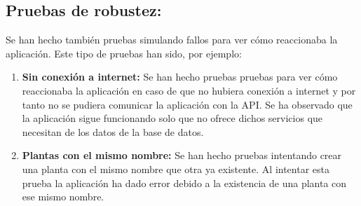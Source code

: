 \subsection{Pruebas de robustez:}
Se han hecho también pruebas simulando fallos para ver cómo reaccionaba la aplicación. Este tipo de pruebas han sido, por ejemplo:
    \begin{enumerate}
        \item \textbf{Sin conexión a internet:} Se han hecho pruebas pruebas para ver cómo reaccionaba la aplicación en caso de que no hubiera conexión a internet y por tanto no se pudiera comunicar la aplicación con la API. Se ha observado que la aplicación sigue funcionando solo que no ofrece dichos servicios que necesitan de los datos de la base de datos.
        \item \textbf{Plantas con el mismo nombre:} Se han hecho pruebas intentando crear una planta con el mismo nombre que otra ya existente. Al intentar esta prueba la aplicación ha dado error debido a la existencia de una planta con ese mismo nombre.
    \end{enumerate}
    